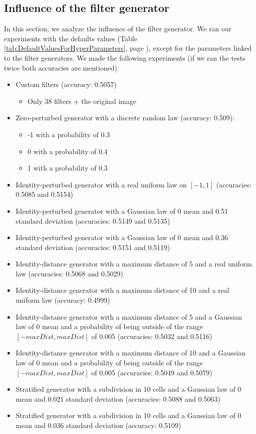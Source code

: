 \documentclass[a4paper]{report}
\begin{document}
	
	
		
	\subsection{Influence of the filter generator}
	In this section, we analyze the influence of the filter generator. We ran our experiments with the defaults values (Table \ref{tab:DefaultValuesForHyperParameters}, page \pageref{tab:DefaultValuesForHyperParameters}), except for the parameters linked to the filter generators. We made the following experiments (if we ran the tests twice both accuracies are mentioned): 
	
	\begin{itemize}
		\item Custom filters (accuracy: 0.5057)
		\begin{itemize}
			\item Only 38 filters + the original image
		\end{itemize}
		\item Zero-perturbed generator with a discrete random law (accuracy: 0.509):
		\begin{itemize}
			\item -1 with a probability of 0.3
			\item 0 with a probability of 0.4
			\item 1 with a probability of 0.3
		\end{itemize}
		\item Identity-perturbed generator with a real uniform law on $[-1, 1]$ (accuracies: 0.5085 and 0.5154)
		\item Identity-perturbed generator with a Gaussian law of 0 mean and 0.51 standard deviation (accuracies: 0.5149 and 0.5135)
		\item Identity-perturbed generator with a Gaussian law of 0 mean and 0.36 standard deviation (accuracies: 0.5151 and 0.5119)
		\item Identity-distance generator with a maximum distance of 5 and a real uniform law (accuracies: 0.5068 and 0.5029)
		\item Identity-distance generator with a maximum distance of 10 and a real uniform law (accuracy: 0.4999)
		\item Identity-distance generator with a maximum distance of 5 and a Gaussian law of 0 mean and a probability of being outside of the range $[-maxDist, maxDist]$ of 0.005 (accuracies: 0.5032 and 0.5116)
		\item Identity-distance generator with a maximum distance of 10 and a Gaussian law of 0 mean and a probability of being outside of the range $[-maxDist, maxDist]$ of 0.005 (accuracies: 0.5049 and 0.5079)
		\item Stratified generator with a subdivision in 10 cells and a Gaussian law of 0 mean and 0.021 standard deviation (accuracies: 0.5088 and 0.5063)
		\item Stratified generator with a subdivision in 10 cells and a Gaussian law of 0 mean and 0.036 standard deviation (accuracy: 0.5109)
	\end{itemize}
	
\end{document}
